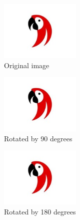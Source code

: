 \documentclass{article}
\begin{document}
	
	\listoffigures
	\pagebreak
	
	\begin{figure}[h]
		\centering
		\includegraphics[width=1.5in]{parrot.jpeg}
		\caption{Original image}
	\end{figure}
	
	\begin{figure}[h]
		\centering
		\includegraphics[width=1.5in, angle=90]{parrot.jpeg}
		\caption{Rotated by 90 degrees}
	\end{figure}
	
	
	\begin{figure}[h]
		\centering
		\includegraphics[width=1.5in, angle=180]{parrot.jpeg}
		\caption{Rotated by 180 degrees}
	\end{figure}
\end{document}
